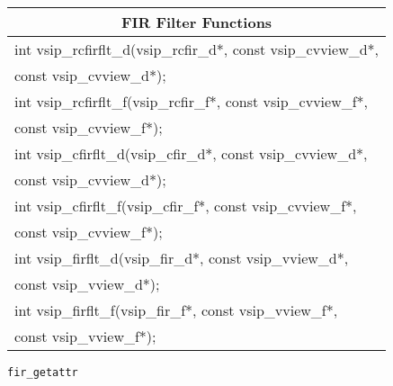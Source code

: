 \newline \hspace*{1.cm} {
\ttfamily
\begin{tabular}[H]{|l|}
\hline \multicolumn{1}{c}{\rmfamily \bfseries FIR Filter Functions\vspace{.1cm}}\\ \hline
int vsip\_rcfirflt\_d(vsip\_rcfir\_d*, const vsip\_cvview\_d*,\\*\hspace{.7cm}const vsip\_cvview\_d*);\\
int vsip\_rcfirflt\_f(vsip\_rcfir\_f*, const vsip\_cvview\_f*,\\*\hspace{.7cm}const vsip\_cvview\_f*);\\
int vsip\_cfirflt\_d(vsip\_cfir\_d*, const vsip\_cvview\_d*,\\*\hspace{.7cm}const vsip\_cvview\_d*);\\
int vsip\_cfirflt\_f(vsip\_cfir\_f*, const vsip\_cvview\_f*,\\*\hspace{.7cm}const vsip\_cvview\_f*);\\
int vsip\_firflt\_d(vsip\_fir\_d*, const vsip\_vview\_d*,\\*\hspace{.7cm}const vsip\_vview\_d*);\\
int vsip\_firflt\_f(vsip\_fir\_f*, const vsip\_vview\_f*,\\*\hspace{.7cm}const vsip\_vview\_f*);\\\hline
\end{tabular}\vspace{.1cm}
}
\clearpage
\hspace*{.8cm} \texttt{fir\_getattr}
